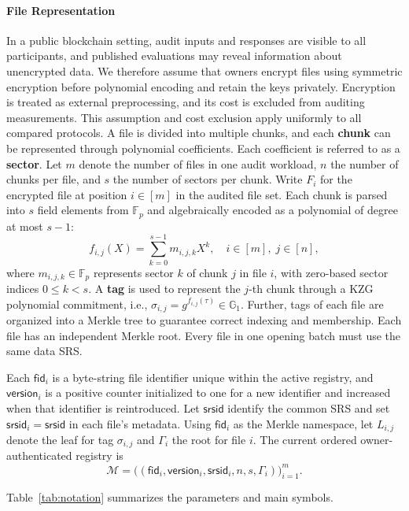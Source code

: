 \documentclass[lettersize,journal]{IEEEtran}
\newcommand{\GG}{\mathbb{G}}
\newcommand{\FF}{\mathbb{F}}
\begin{document}
\paragraph{File Representation}
In a public blockchain setting, audit inputs and responses are visible to all participants, and published evaluations may reveal information about unencrypted data. We therefore assume that owners encrypt files using symmetric encryption before polynomial encoding and retain the keys privately. Encryption is treated as external preprocessing, and its cost is excluded from auditing measurements. This assumption and cost exclusion apply uniformly to all compared protocols.
A file is divided into multiple chunks, and each \textbf{chunk} can be represented through polynomial coefficients. Each coefficient is referred to as a \textbf{sector}.
Let $m$ denote the number of files in one audit workload, $n$ the number of chunks per file, and $s$ the number of sectors per chunk. Write $F_i$ for the encrypted file at position $i\in[m]$ in the audited file set. Each chunk is parsed into $s$ field elements from $\FF_p$ and algebraically encoded as a polynomial of degree at most $s-1$:
$$
    f_{i,j}(X) = \sum_{k=0}^{s-1} m_{i,j,k} X^k, \quad i \in [m], \; j \in [n],
$$
where $m_{i,j,k}\in\FF_p$ represents sector $k$ of chunk $j$ in file $i$, with zero-based sector indices $0\leq k<s$.
A \textbf{tag} is used to represent the \(j\)-th chunk through a KZG polynomial commitment, i.e., $\sigma_{i,j} =  g^{f_{i,j}(\tau)} \in \GG_1$. Further, tags of each file are organized into a Merkle tree to guarantee correct indexing and membership. Each file has an independent Merkle root. Every file in one opening batch must use the same data SRS.

Each $\mathsf{fid}_i$ is a byte-string file identifier unique within the active registry, and $\mathsf{version}_i$ is a positive counter initialized to one for a new identifier and increased when that identifier is reintroduced. Let $\mathsf{srsid}$ identify the common SRS and set $\mathsf{srsid}_i=\mathsf{srsid}$ in each file's metadata. Using $\mathsf{fid}_i$ as the Merkle namespace, let $L_{i,j}$ denote the leaf for tag $\sigma_{i,j}$ and $\Gamma_i$ the root for file $i$. The current ordered owner-authenticated registry is
\[
\mathcal M=\bigl((\mathsf{fid}_i,\mathsf{version}_i,\mathsf{srsid}_i,n,s,\Gamma_i)\bigr)_{i=1}^m.
\]

Table~\ref{tab:notation} summarizes the parameters and main symbols.
\end{document}
